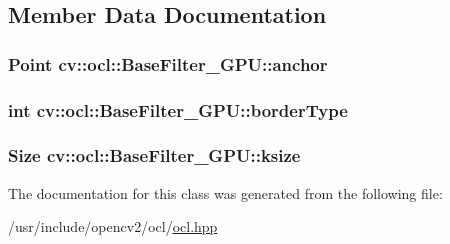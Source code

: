 \subsection{Member Data Documentation}
\hypertarget{classcv_1_1ocl_1_1BaseFilter__GPU_a0b79334caba140c25d6fc5c5f2a7fd6c}{
\subsubsection[{anchor}]{\setlength{\rightskip}{0pt plus 5cm}Point cv\-::ocl\-::\-Base\-Filter\-\_\-\-G\-P\-U\-::anchor}}\label{classcv_1_1ocl_1_1BaseFilter__GPU_a0b79334caba140c25d6fc5c5f2a7fd6c}
\hypertarget{classcv_1_1ocl_1_1BaseFilter__GPU_a5d5aff7ac2df54c9df5a53f9a0ced130}{
\subsubsection[{border\-Type}]{\setlength{\rightskip}{0pt plus 5cm}int cv\-::ocl\-::\-Base\-Filter\-\_\-\-G\-P\-U\-::border\-Type}}\label{classcv_1_1ocl_1_1BaseFilter__GPU_a5d5aff7ac2df54c9df5a53f9a0ced130}
\hypertarget{classcv_1_1ocl_1_1BaseFilter__GPU_a433c3b4149e762a56eea38f938b4a727}{
\subsubsection[{ksize}]{\setlength{\rightskip}{0pt plus 5cm}Size cv\-::ocl\-::\-Base\-Filter\-\_\-\-G\-P\-U\-::ksize}}\label{classcv_1_1ocl_1_1BaseFilter__GPU_a433c3b4149e762a56eea38f938b4a727}


The documentation for this class was generated from the following file\-:\begin{DoxyCompactItemize}
\item 
/usr/include/opencv2/ocl/\hyperlink{ocl_2ocl_8hpp}{ocl.\-hpp}\end{DoxyCompactItemize}
